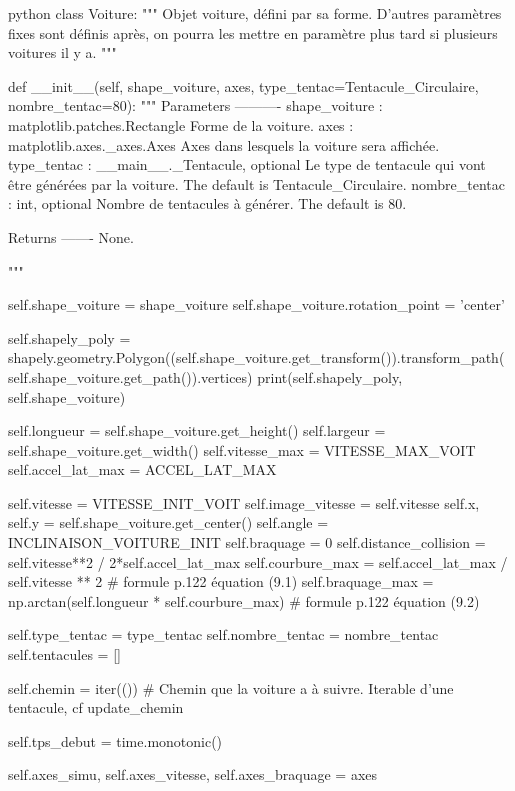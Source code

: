 \begin{mintedbox}{python}
class Voiture:
    """
    Objet voiture, défini par sa forme. D'autres paramètres fixes sont définis après, on pourra les mettre en paramètre plus tard si plusieurs voitures il y a.
    """

    def __init__(self, shape_voiture, axes, type_tentac=Tentacule_Circulaire, nombre_tentac=80):
        """
        Parameters
        ----------
        shape_voiture : matplotlib.patches.Rectangle
            Forme de la voiture.
        axes : matplotlib.axes._axes.Axes
            Axes dans lesquels la voiture sera affichée.
        type_tentac : __main__._Tentacule, optional
            Le type de tentacule qui vont être générées par la voiture. The default is Tentacule_Circulaire.
        nombre_tentac : int, optional
            Nombre de tentacules à générer. The default is 80.

        Returns
        -------
        None.

        """

        self.shape_voiture = shape_voiture
        self.shape_voiture.rotation_point = 'center'

        self.shapely_poly = shapely.geometry.Polygon((self.shape_voiture.get_transform()).transform_path( self.shape_voiture.get_path()).vertices)
        print(self.shapely_poly, self.shape_voiture)

        self.longueur = self.shape_voiture.get_height()
        self.largeur = self.shape_voiture.get_width()
        self.vitesse_max = VITESSE_MAX_VOIT
        self.accel_lat_max = ACCEL_LAT_MAX

        self.vitesse = VITESSE_INIT_VOIT
        self.image_vitesse = self.vitesse
        self.x, self.y = self.shape_voiture.get_center()
        self.angle = INCLINAISON_VOITURE_INIT
        self.braquage = 0
        self.distance_collision = self.vitesse**2 / 2*self.accel_lat_max
        self.courbure_max = self.accel_lat_max / self.vitesse ** 2  # formule p.122 équation (9.1)
        self.braquage_max = np.arctan(self.longueur * self.courbure_max)  # formule p.122 équation (9.2)

        self.type_tentac = type_tentac
        self.nombre_tentac = nombre_tentac
        self.tentacules = []

        self.chemin = iter(())  # Chemin que la voiture a à suivre. Iterable d'une tentacule, cf update_chemin

        self.tps_debut = time.monotonic()

        self.axes_simu, self.axes_vitesse, self.axes_braquage = axes


\end{mintedbox}
